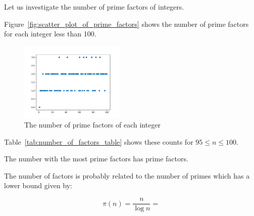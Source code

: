Let us investigate the number of prime factors of integers.

Figure~\ref{fig:scatter_plot_of_prime_factors} shows the number of prime
factors for each integer less than 100.

\begin{center}
    \begin{figure}[!hbtp]
        \includegraphics[width=5cm]{src/scatter_plot_of_prime_factors.pdf}
        \caption{The number of prime factors of each integer}
        \label{scatter_plot_of_prime_factors}
    \end{figure}
\end{center}

Table~\ref{tab:number_of_factors_table} shows these counts for \(95\leq
n\leq 100\).

\begin{center}
    \begin{table}[!hbtp]
        
    \end{table}
\end{center}

The number with the most prime factors
has prime factors.

The number of factors is probably related to the number of primes which has
a lower bound given by:

\small
\[
\pi(n)=\frac{n}{\log{n}}=
\]
